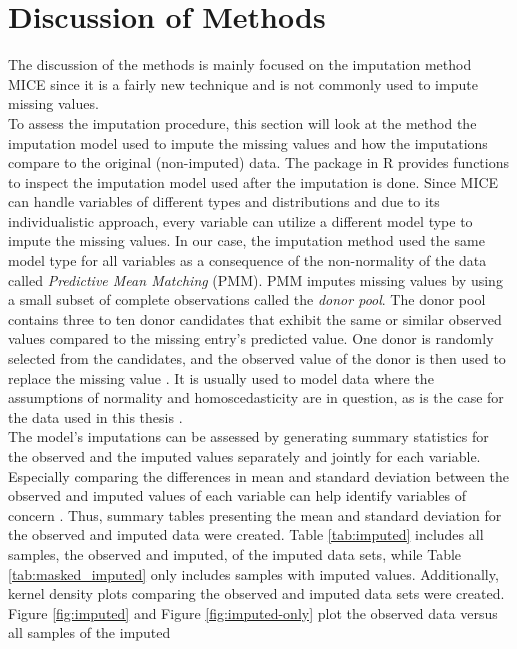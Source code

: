 \section{Discussion of Methods}
The discussion of the methods is mainly focused on the imputation method MICE 
since it is a fairly new technique and is not commonly used to impute missing 
values.
\\
To assess the imputation procedure, this section will look at the 
method the imputation model used to impute the missing values and how the 
imputations compare to the original (non-imputed) data. The  
package in R provides functions to inspect the imputation model used after the 
imputation is done. Since MICE can handle variables of different types and 
distributions and due to its individualistic approach, every variable can 
utilize a different model type to impute the missing values. In our case, the 
imputation method used the same model type for all variables as a consequence 
of the non-normality of the data called \textit{Predictive Mean Matching} (PMM).
PMM imputes missing values by using a small subset of complete observations 
called the \textit{donor pool}. The donor pool contains three to ten donor 
candidates 
that exhibit the same or similar observed values compared to the missing 
entry's predicted value. One donor is randomly selected from the candidates, 
and the observed value of the donor is then used to replace the missing value 
\cite{RN144, RN145, RN146}. It is usually used to model data where the 
assumptions of normality and homoscedasticity are in question, as is the case 
for the data used in this thesis \cite{RN146}.
\\
The model's imputations can be assessed by generating summary statistics for the
observed and the imputed values separately and jointly for each variable. 
Especially comparing the differences in mean and standard deviation between the 
observed and imputed values of each variable can help identify variables of 
concern \cite{RN141}. Thus, summary tables presenting the mean and standard 
deviation for the observed and imputed data were created. Table 
\ref{tab:imputed} includes all samples, the observed and imputed, of the imputed 
data sets, while Table \ref{tab:masked_imputed} only includes samples with 
imputed values. Additionally, kernel density plots comparing the observed and 
imputed data sets were created. Figure \ref{fig:imputed} and Figure 
\ref{fig:imputed-only} plot the observed data versus all samples of the imputed 
